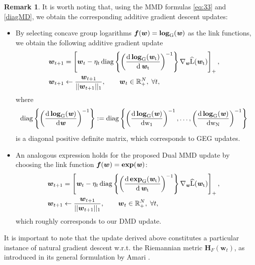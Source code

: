 \documentclass[10pt]{amsart}
\newcommand{\bi}[1]{\textbf{\textit{#1}}}
\newcommand{\bexp}{\rm{\bf{exp}}}
\newcommand{\blog}{\rm{\bf{log}}}
\newcommand{\bof}{\boldsymbol{f}}
\newcommand{\bH}{\boldsymbol{H}}
\newcommand{\bw}{\boldsymbol{w}}
\theoremstyle{definition}
\newtheorem{remark}{\textbf{Remark}}
\theoremstyle{definition}	 %
\begin{document}
\vspace{5mm}

\begin{remark}
It is worth noting that, using the MMD formulas  \eqref{eq:33} and \eqref{diagMD}, we obtain the corresponding additive gradient descent updates:

\begin{itemize}

\item
By selecting concave group logarithms $\bof(\bw) = \blog_G(\bi w)$ as the link functions, we obtain the following additive gradient update
%
\begin{align}
\bw_{t+1} &= \left[\bw_t  - \eta_t \, \rm{diag} \left\{\left(
\frac{d\,\blog_G(\bi w_t)}{d \,  \bi w_t}\right)^{-1}\right\} \nabla_{\bi w} \widehat{L}(\bi w_t)\right]_+,\\ 
\bw_{t+1} &\leftarrow  \frac{\bw_{t+1}}{||\bw_{t+1}||_1}, \quad \quad  \bw_t \in \mathbb{R}_+^N,\; \forall t,
		\label{diagMDL}
\end{align}
%
where $$ \displaystyle \rm{diag} \left\{ \left(\frac{d\,\blog_G(\bi w)}{d \bi w}\right)^{-1}\right\} := \rm{diag} \left\{ \left(\frac{d\,\blog_G(\bi w)}{d w_1} \right)^{-1}, \ldots, \left(\frac{d\,\blog_G(\bi w)}{d w_N}\right)^{-1} \right\} $$ is a diagonal positive definite matrix, which corresponds to GEG updates.


\item
An analogous expression holds for the proposed  Dual MMD update by choosing the link function $\bof(\bw) =\bexp(\bi w)$:
\begin{align}
\bw_{t+1} &= \left[\bi w_t  - \eta_t \,\rm{diag} \left\{\left(
\frac{d\,\bexp_G(\bi w_t)}{d \, \bi w_t}\right)^{-1}\right\} \nabla_{\bi w} \widehat{L}(\bi w_t)\right]_+, \\ 
\bw_{t+1} &\leftarrow  \frac{\bw_{t+1}}{||\bw_{t+1}||_1}, \quad \quad  \bw_t \in \mathbb{R}_+^N,\; \forall t,
		\label{diagDMMD}
\end{align}
which roughly corresponds to our DMD update.

\end{itemize}
\end{remark}
It is important  to note that the update derived above constitutes a particular instance of  natural gradient descent w.r.t. the Riemannian metric $\bH_F(\bw_t)$, as introduced in its general formulation  by Amari \cite{Amari-98}.
\end{document}
